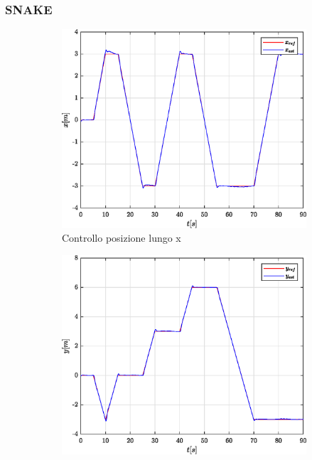 \subsubsection{SNAKE}
\begin{figure}
	\centering
	\begin{subfigure}{0.45\textwidth}
		\centering
		\includegraphics[width=1\textwidth]{Simulazioni/Figure/SMC/SNAKE/PositionControlXPos}
		\caption{Controllo posizione lungo x}
		\label{fig:SNAKEerrposxSMC}
	\end{subfigure}
	\hfill
	\begin{subfigure}{0.45\textwidth}
		\centering
		\includegraphics[width=1\textwidth]{Simulazioni/Figure/SMC/SNAKE/PositionControlYPos}

\end{subfigure}
\end{figure}
